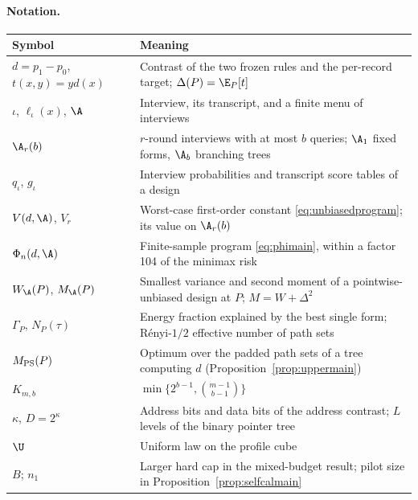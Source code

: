 \paragraph{Notation.}
\begin{center}\small
\begin{tabular}{lp{10.5cm}}
\toprule
Symbol & Meaning\\
\midrule
$d=p_1-p_0$, $t(x,y)=yd(x)$ & Contrast of the two frozen rules and the per-record target; $\Delta(P)=\E_P[t]$\\
$\iota$, $\ell_\iota(x)$, $\A$ & Interview, its transcript, and a finite menu of interviews\\
$\A_r(b)$ & $r$-round interviews with at most $b$ queries; $\A_1$ fixed forms, $\A_b$ branching trees\\
$q_\iota$, $g_\iota$ & Interview probabilities and transcript score tables of a design\\
$V(d,\A)$, $V_r$ & Worst-case first-order constant \eqref{eq:unbiasedprogram}; its value on $\A_r(b)$\\
$\Phi_n(d,\A)$ & Finite-sample program \eqref{eq:phimain}, within a factor 104 of the minimax risk\\
$W_\A(P)$, $M_\A(P)$ & Smallest variance and second moment of a pointwise-unbiased design at $P$; $M=W+\Delta^2$\\
$\Gamma_P$, $N_P(\tau)$ & Energy fraction explained by the best single form; R\'enyi-$1/2$ effective number of path sets\\
$M_{\rm PS}(P)$ & Optimum over the padded path sets of a tree computing $d$ (Proposition~\ref{prop:uppermain})\\
$K_{m,b}$ & $\min\{2^{b-1},\binom{m-1}{b-1}\}$\\
$\kappa$, $D=2^\kappa$ & Address bits and data bits of the address contrast; $L$ levels of the binary pointer tree\\
$\U$ & Uniform law on the profile cube\\
$B$; $n_1$ & Larger hard cap in the mixed-budget result; pilot size in Proposition~\ref{prop:selfcalmain}\\
\bottomrule
\end{tabular}
\end{center}

